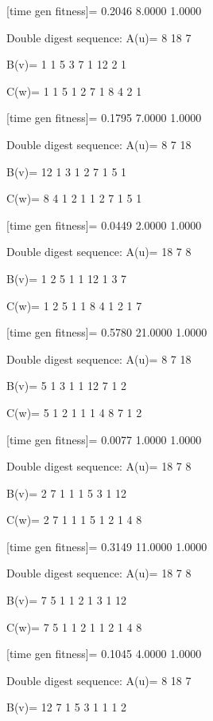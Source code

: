 [time gen fitness]=
    0.2046    8.0000    1.0000

Double digest sequence:
A(u)=
     8    18     7

B(v)=
     1     1     5     3     7     1    12     2     1

C(w)=
     1     1     5     1     2     7     1     8     4     2     1

[time gen fitness]=
    0.1795    7.0000    1.0000

Double digest sequence:
A(u)=
     8     7    18

B(v)=
    12     1     3     1     2     7     1     5     1

C(w)=
     8     4     1     2     1     1     2     7     1     5     1

[time gen fitness]=
    0.0449    2.0000    1.0000

Double digest sequence:
A(u)=
    18     7     8

B(v)=
     1     2     5     1     1    12     1     3     7

C(w)=
     1     2     5     1     1     8     4     1     2     1     7

[time gen fitness]=
    0.5780   21.0000    1.0000

Double digest sequence:
A(u)=
     8     7    18

B(v)=
     5     1     3     1     1    12     7     1     2

C(w)=
     5     1     2     1     1     1     4     8     7     1     2

[time gen fitness]=
    0.0077    1.0000    1.0000

Double digest sequence:
A(u)=
    18     7     8

B(v)=
     2     7     1     1     1     5     3     1    12

C(w)=
     2     7     1     1     1     5     1     2     1     4     8

[time gen fitness]=
    0.3149   11.0000    1.0000

Double digest sequence:
A(u)=
    18     7     8

B(v)=
     7     5     1     1     2     1     3     1    12

C(w)=
     7     5     1     1     2     1     1     2     1     4     8

[time gen fitness]=
    0.1045    4.0000    1.0000

Double digest sequence:
A(u)=
     8    18     7

B(v)=
    12     7     1     5     3     1     1     1     2

